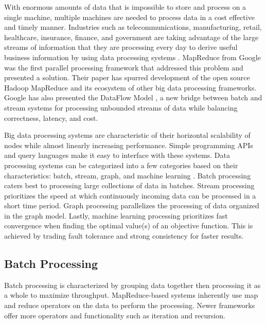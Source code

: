 \documentclass[12pt]{article}
\begin{document}
With enormous amounts of data that is impossible to store and process on a single machine, multiple machines are needed to process data in a cost effective and timely manner. Industries such as telecommunications, manufacturing, retail, healthcare, insurance, finance, and government are taking advantage of the large streams of information that they are processing every day to derive useful business information by using data processing systems \cite{ibmbigdataindustries}. MapReduce from Google \cite{dean2008mapreduce} was the first parallel processing framework that addressed this problem and presented a solution. Their paper has spurred development of the open source Hadoop MapReduce \cite{hadoop} and its ecosystem of other big data processing frameworks. Google has also presented the DataFlow Model \cite{akidau2015dataflow}, a new bridge between batch and stream systems for processing unbounded streams of data while balancing correctness, latency, and cost.

Big data processing systems are characteristic of their horizontal scalability of nodes while almost linearly increasing performance. Simple programming APIs and query languages make it easy to interface with these systems. Data processing systems can be categorized into a few categories based on their characteristics: batch, stream, graph, and machine learning \cite{zhang2016survey}. Batch processing caters best to processing large collections of data in batches. Stream processing prioritizes the speed at which continuously incoming data can be processed in a short time period. Graph processing parallelizes the processing of data organized in the graph model. Lastly, machine learning processing prioritizes fast convergence when finding the optimal value(s) of an objective function. This is achieved by trading fault tolerance and strong consistency for faster results.




\subsection{Batch Processing} \label{sub:batch}

Batch processing is characterized by grouping data together then processing it as a whole to maximize throughput. MapReduce-based systems inherently use map and reduce operators on the data to perform the processing. Newer frameworks offer more operators and functionality such as iteration and recursion.
\end{document}
